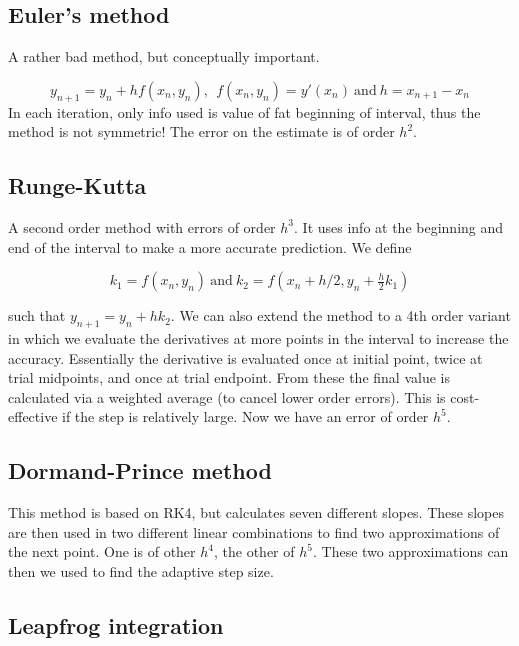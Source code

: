 \documentclass[a4paper]{article}
\begin{document}
\subsection{Euler's method}

A rather bad method, but conceptually important. 

\begin{equation*}
    y_{n+1}=y_n+hf(x_n, y_n),\ \ f(x_n, y_n)=y'(x_n)\ \text{and}\ h = x_{n+1}-x_n
\end{equation*}
In each iteration, only info used is value of fat beginning of interval, thus the method is not symmetric! The error on the estimate is of order $h^2$.

\subsection{Runge-Kutta}

A second order method with errors of order $h^3$. It uses info at the beginning and end of the interval to make a more accurate prediction. We define

\begin{equation*}
    k_1=f(x_n, y_n)\ \text{and}\ k_2=f(x_n+h/2, y_n+\tfrac{h}{2}k_1)
\end{equation*}

such that $y_{n+1}=y_n+hk_2$. We can also extend the method to a 4th order variant in which we evaluate the derivatives at more points in the interval to increase the accuracy. Essentially the derivative is evaluated once at initial point, twice at trial midpoints, and once at trial endpoint. From these the final value is calculated via a weighted average (to cancel lower order errors). This is cost-effective if the step is relatively large. Now we have an error of order $h^5$.

\subsection{Dormand-Prince method}

This method is based on RK4, but calculates seven different slopes. These slopes are then used in two different linear combinations to find two approximations of the next point. One is of other $h^4$, the other of $h^5$. These two approximations can then we used to find the adaptive step size.

\subsection{Leapfrog integration}
\end{document}
